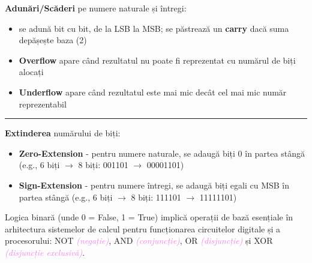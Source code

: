 \documentclass[a4paper,10pt]{article}
\newcommand{\hl}[1]{\textcolor{violet}{\textit{#1}}}
\begin{document}
\noindent \textbf{Adunări/Scăderi} pe numere naturale și întregi:
\begin{itemize}
    \item se adună bit cu bit, de la LSB la MSB; se păstrează un \textbf{carry} dacă suma depășește baza (2)
    \item \textbf{Overflow} apare când rezultatul nu poate fi reprezentat cu numărul de biți alocați
    \item \textbf{Underflow} apare când rezultatul este mai mic decât cel mai mic număr reprezentabil
\end{itemize}
\hrule
\vspace{0.2cm}
\noindent \textbf{Extinderea} numărului de biți:
\begin{itemize}
    \item \textbf{Zero-Extension} - pentru numere naturale, se adaugă biți 0 în partea stângă (e.g., 6 biți $\rightarrow$ 8 biți: 001101 $\rightarrow$ 00001101)
    \item \textbf{Sign-Extension} - pentru numere întregi, se adaugă biți egali cu MSB în partea stângă (e.g., 6 biți $\rightarrow$ 8 biți: 111101 $\rightarrow$ 11111101)
\end{itemize}

Logica binară (unde 0 = False, 1 = True) implică operații de bază esențiale în arhitectura sistemelor de calcul pentru funcționarea circuitelor digitale și a procesorului: NOT \hl{(negație)}, AND \hl{(conjuncție)}, OR \hl{(disjuncție)} și XOR \hl{(disjuncție exclusivă)}.
\vspace{0.3cm}
\end{document}
